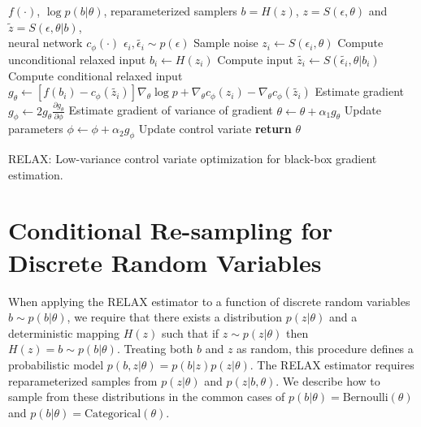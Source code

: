 \documentclass{article}
\newcommand{\RELAX}{{\textnormal{RELAX}}}
\begin{document}
\begin{algorithm}[h]
	\begin{algorithmic}
		\Require $f(\cdot)$, $\log p(b|\theta)$, reparameterized samplers $b = H(z)$, $z = S(\epsilon, \theta)$ and $\tilde{z} = S(\epsilon, \theta | b)$, \\ 
		\hspace{3em} neural network $c_\phi(\cdot)$   
		\State $\epsilon_{i}, \widetilde{\epsilon_i} \sim p(\epsilon)$ \Comment Sample noise
		\State $z_i \leftarrow S(\epsilon_i, \theta)$ \Comment Compute unconditional relaxed input
		\State $b_i \leftarrow H(z_i)$ \Comment Compute input
		\State $\widetilde{z_i} \leftarrow S(\widetilde{\epsilon_i}, \theta | b_i)$ \Comment Compute conditional relaxed input
		\State  $g_\theta \leftarrow \left[f(b_i) - c_{\phi}(\widetilde{z_i}) \right] \nabla_\theta \log p + \nabla_\theta c_\phi(z_i) - \nabla_\theta c_\phi(\widetilde{z_i})$ \Comment Estimate gradient
		\State  $g_\phi \leftarrow 2 g_\theta \frac{\partial g_\theta}{\partial \phi}$ \Comment Estimate gradient of variance of gradient
		\State $\theta \leftarrow \theta + \alpha_1 g_\theta$ \Comment Update parameters
		\State $\phi \leftarrow \phi + \alpha_2 g_\phi$ \Comment Update control variate
		\EndWhile
		\State \textbf{return} $\theta$ 
	\end{algorithmic}
	\caption{\RELAX{}: Low-variance control variate optimization for black-box gradient estimation.}
	\label{relax}
\end{algorithm}





\section{Conditional Re-sampling for Discrete Random Variables}
\label{resample}
When applying the RELAX estimator to a function of discrete random variables $b \sim p(b|\theta)$, we require that there exists a distribution $p(z|\theta)$ and a deterministic mapping $H(z)$ such that if $z \sim p(z|\theta)$ then $H(z) = b \sim p(b|\theta)$. Treating both $b$ and $z$ as random, this procedure defines a probabilistic model $p(b, z | \theta) = p(b|z)p(z|\theta)$. The RELAX estimator requires reparameterized samples from $p(z|\theta)$ and $p(z|b,\theta)$. We describe how to sample from these distributions in the common cases of $p(b|\theta) = \text{Bernoulli}(\theta)$ and $p(b|\theta) = \text{Categorical}(\theta)$.
\end{document}
